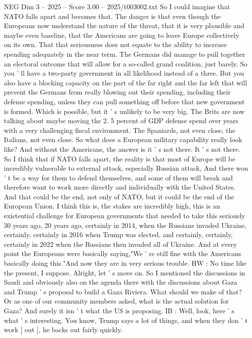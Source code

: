 \begin{textsample}{NEG Dim 3 – 2025 – Score 3.00 – 2025/t003002.txt}
So I could imagine that NATO falls apart and becomes that.
The danger is that even though the Europeans now understand the nature of the threat, that it is very plausible and maybe even baseline, that the Americans are going to leave Europe collectively on its own.
That that seriousness does not equate to the ability to increase spending adequately in the near term.
The Germans did manage to pull together an electoral outcome that will allow for a so-called grand coalition, just barely.
So you ' ll have a two-party government in all likelihood instead of a three.
But you also have a blocking capacity on the part of the far right and the far left that will prevent the Germans from really blowing out their spending, including their defense spending, unless they can pull something off before that new government is formed.
Which is possible, but it ' s unlikely to be very big.
The Brits are now talking about maybe moving the 2. 5 percent of GDP defense spend over years with a very challenging fiscal environment.
The Spaniards, not even close, the Italians, not even close.
So what does a European military capability really look like?
And without the Americans, the answer is it ' s not there.
It ' s not there.
So I think that if NATO falls apart, the reality is that most of Europe will be incredibly vulnerable to external attack, especially Russian attack, And there won ' t be a way for them to defend themselves, and some of them will break and therefore want to work more directly and individually with the United States.
And that could be the end, not only of NATO, but it could be the end of the European Union.
I think this is, the stakes are incredibly high, this is an existential challenge for European governments that needed to take this seriously 30 years ago, 20 years ago, certainly in 2014, when the Russians invaded Ukraine, certainly, certainly in 2016 when Trump was elected, and certainly, certainly, certainly in 2022 when the Russians then invaded all of Ukraine.
And at every point the Europeans were basically saying,"We ' re still fine with the Americans basically doing this."And now they are in very serious trouble.
HW : No time like the present, I suppose.
Alright, let ' s move on.
So I mentioned the discussions in Saudi and obviously also on the agenda there with the discussions about Gaza and Trump ' s proposal to build a Gaza Riviera.
What should we make of that?
Or as one of our community members asked, what is the actual solution for Gaza?
And surely it isn ' t what the US is proposing.
IB : Well, look, here ' s what ' s interesting.
You know, Trump says a lot of things, and when they don ' t work [ out ], he backs out fairly quickly.

\end{textsample}

